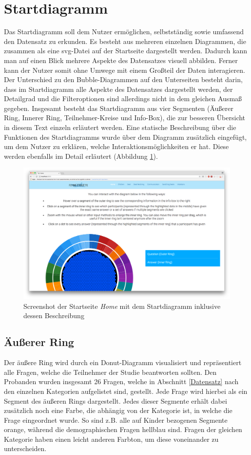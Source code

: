 \documentclass{mi-seminar}
\begin{document}
\section{Startdiagramm}
Das Startdiagramm soll dem Nutzer ermöglichen, selbstständig sowie umfassend den Datensatz zu erkunden. Es besteht aus mehreren einzelnen Diagrammen, die zusammen als eine svg-Datei auf der Startseite dargestellt werden. Dadurch kann man auf einen Blick mehrere Aspekte des Datensatzes visuell abbilden. Ferner kann der Nutzer somit ohne Umwege mit einem Großteil der Daten interagieren. Der Unterschied zu den Bubble-Diagrammen auf den Unterseiten besteht darin, dass im Startdiagramm alle Aspekte des Datensatzes dargestellt werden, der Detailgrad und die Filteroptionen sind allerdings nicht in dem gleichen Ausmaß gegeben. Insgesamt besteht das Startdiagramm aus vier Segmenten (Äußerer Ring, Innerer Ring, Teilnehmer-Kreise und Info-Box), die zur besseren Übersicht in diesem Text einzeln erläutert werden. Eine statische Beschreibung über die Funktionen des Startdiagramms wurde über dem Diagramm zusätzlich eingefügt, um dem Nutzer zu erklären, welche Interaktionsmöglichkeiten er hat. Diese werden ebenfalls im Detail erläutert (Abbildung \ref{ScStartDiagram}).
\FloatBarrier
\begin{figure}[h]
\includegraphics[scale=0.3]{assets/start_startpage.png}
\caption{Screenshot der Startseite \textit{Home} mit dem Startdiagramm inklusive dessen Beschreibung}
\label{ScStartDiagram}
\end{figure}

\subsection{Äußerer Ring}
Der äußere Ring wird durch ein Donut-Diagramm visualisiert und repräsentiert alle Fragen, welche die Teilnehmer der Studie beantworten sollten. Den Probanden wurden insgesamt 26 Fragen, welche in Abschnitt \ref{Datensatz} nach den einzelnen Kategorien aufgelistet sind, gestellt. Jede Frage wird hierbei als ein Segment des äußeren Rings dargestellt. Jedes dieser Segmente erhält dabei zusätzlich noch eine Farbe, die abhängig von der Kategorie ist, in welche die Frage eingeordnet wurde. So sind z.B. alle auf Kinder bezogenen Segmente orange, während die demographischen Fragen hellblau sind. Fragen der gleichen Kategorie haben einen leicht anderen Farbton, um diese voneinander zu unterscheiden. 
\end{document}
